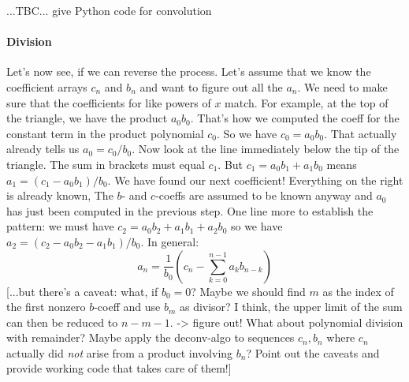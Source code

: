 ...TBC... give Python code for convolution

\paragraph{Division}
Let's now see, if we can reverse the process. Let's assume that we know the coefficient arrays $c_n$ and $b_n$ and want to figure out all the $a_n$. We need to make sure that the coefficients for like powers of $x$ match. For example, at the top of the triangle, we have the product $a_0 b_0$. That's how we computed the coeff for the constant term in the product polynomial $c_0$. So we have $c_0 = a_0 b_0$. That actually already tells us $a_0 = c_0 / b_0$. Now look at the line immediately below the tip of the triangle. The sum in brackets must equal $c_1$. But $c_1 = a_0 b_1 + a_1 b_0$ means $a_1 = (c_1 -a_0 b_1)/b_0$. We have found our next coefficient! Everything on the right is already known, The $b$- and $c$-coeffs are assumed to be known anyway and $a_0$ has just been computed in the previous step. One line more to establish the pattern: we must have $c_2 = a_0 b_2 + a_1 b_1 + a_2 b_0$ so we have $a_2 = (c_2 - a_0 b_2 - a_1 b_1)/b_0$. In general:
\begin{equation}
a_n = \frac{1}{b_0} (  c_n - \sum_{k=0}^{n-1} a_k b_{n-k} ) 
\end{equation}
[...but there's a caveat: what, if $b_0 = 0$? Maybe we should find $m$ as the index of the first nonzero $b$-coeff and use $b_m$ as divisor? I think, the upper limit of the sum can then be reduced to $n-m-1$. -> figure out! What about polynomial division with remainder? Maybe apply the deconv-algo to sequences $c_n, b_n$ where $c_n$ actually did \emph{not} arise from a product involving $b_n$? Point out the caveats and provide working code that takes care of them!]




